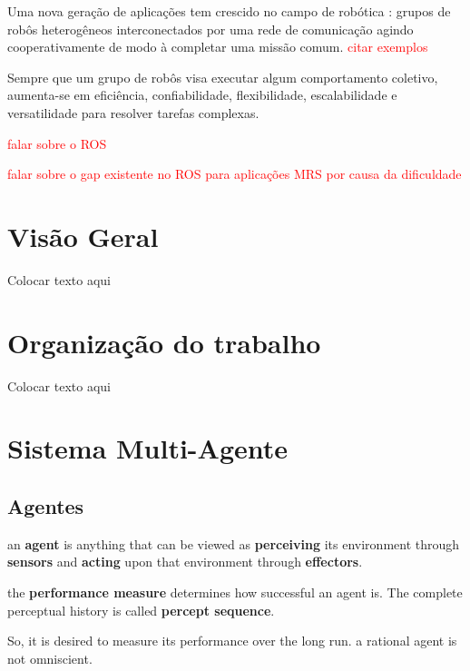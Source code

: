 

    Uma nova geração de aplicações tem crescido no campo de robótica \cite{ref:mohamed2008middleware}: grupos de robôs heterogêneos interconectados por uma rede de comunicação agindo cooperativamente de modo à completar uma missão comum. \textcolor{red}{citar exemplos}
    
    Sempre que um grupo de robôs visa executar algum comportamento coletivo, aumenta-se em eficiência, confiabilidade, flexibilidade, escalabilidade e versatilidade para resolver tarefas complexas.
    
    \textcolor{red}{falar sobre o ROS}
    
    \textcolor{red}{falar sobre o gap existente no ROS para aplicações MRS por causa da dificuldade}

    \section{Visão Geral}
        Colocar texto aqui
    
    \section{Organização do trabalho}
        Colocar texto aqui
    
    \section{Sistema Multi-Agente}
    
        \subsection{Agentes}
        
        
        an \textbf{agent} is anything that can be viewed as \textbf{perceiving} its environment through \textbf{sensors} and \textbf{acting} upon that environment through \textbf{effectors}.
        
        
        the \textbf{performance measure} determines how successful an agent is. The complete perceptual history is called \textbf{percept sequence}.
        
        So, it is desired to measure its performance over the long run.
        a rational agent is not omniscient. 
        
